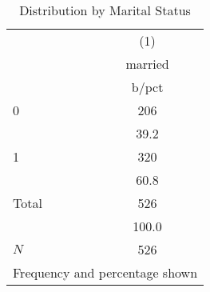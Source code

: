 \begin{table}[htbp]\centering
\def\sym#1{\ifmmode^{#1}\else\(^{#1}\)\fi}
\caption{Distribution by Marital Status}
\begin{tabular}{l*{1}{c}}
\toprule
            &\multicolumn{1}{c}{(1)}\\
            &\multicolumn{1}{c}{married}\\
            &       b/pct\\
\midrule
0           &         206\\
            &        39.2\\
1           &         320\\
            &        60.8\\
Total       &         526\\
            &       100.0\\
\midrule
\(N\)       &         526\\
\bottomrule
\multicolumn{2}{l}{\footnotesize Frequency and percentage shown}\\
\end{tabular}
\end{table}
